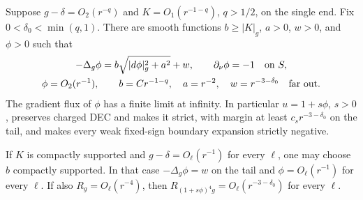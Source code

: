 \begin{lemma}\label{en:strictification}
Suppose $g-\delta=O_2(r^{-q})$ and $K=O_1(r^{-1-q})$, $q>1/2$,
on the single end. Fix $0<\delta_0<\min(q,1)$. There are smooth
functions $b\geq |K|_g$, $a>0$, $w>0$, and $\phi>0$ such that
\begin{equation}\label{en:strict-pde}
 \begin{gathered}
 -\Delta_g\phi=b\sqrt{|d\phi|_g^2+a^2}+w,
 \qquad \partial_\nu\phi=-1\quad\hbox{on }S,\\
 \phi=O_2(r^{-1}),\qquad
 b=Cr^{-1-q},\quad a=r^{-2},\quad w=r^{-3-\delta_0}
 \quad\hbox{far out}.
 \end{gathered}
\end{equation}
The gradient flux of $\phi$ has a finite limit at infinity. In
particular $u=1+s\phi$, $s>0$, preserves charged DEC and makes it
strict, with margin at least $c_s r^{-3-\delta_0}$ on the tail,
and makes every weak fixed-sign boundary expansion strictly negative.

If $K$ is compactly supported and $g-\delta=O_\ell(r^{-1})$ for
every $\ell$, one may choose $b$ compactly supported. In that case
$-\Delta_g\phi=w$ on the tail and $\phi=O_\ell(r^{-1})$ for every
$\ell$. If also $R_g=O_\ell(r^{-4})$, then
$R_{(1+s\phi)^4g}=O_\ell(r^{-3-\delta_0})$ for every $\ell$.
\end{lemma}

